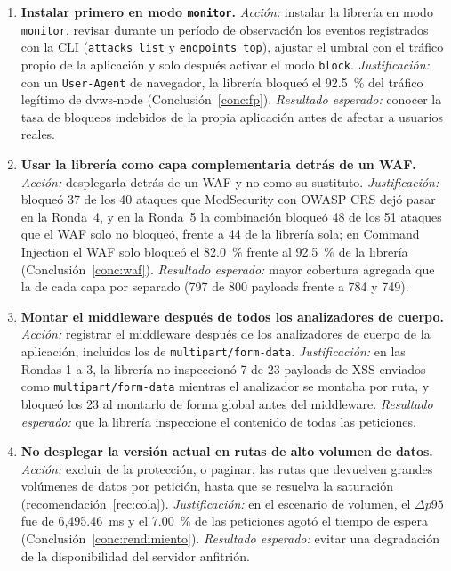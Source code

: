 \begin{enumerate}
    \item \textbf{Instalar primero en modo \texttt{monitor}.} \textit{Acción:} instalar la librería
    en modo \texttt{monitor}, revisar durante un período de observación los eventos registrados con
    la CLI (\texttt{attacks list} y \texttt{endpoints top}), ajustar el umbral con el tráfico propio
    de la aplicación y solo después activar el modo \texttt{block}. \textit{Justificación:} con un
    \texttt{User-Agent} de navegador, la librería bloqueó el 92.5~\% del tráfico legítimo de
    dvws-node (Conclusión~\ref{conc:fp}). \textit{Resultado esperado:} conocer la tasa de bloqueos
    indebidos de la propia aplicación antes de afectar a usuarios reales.

    \item \textbf{Usar la librería como capa complementaria detrás de un WAF.}
    \textit{Acción:} desplegarla detrás de un WAF y no como su sustituto. \textit{Justificación:}
    bloqueó 37 de los 40 ataques que ModSecurity con OWASP CRS dejó pasar en la Ronda~4, y en la
    Ronda~5 la combinación bloqueó 48 de los 51 ataques que el WAF solo no bloqueó, frente a 44 de la
    librería sola; en Command Injection el WAF solo bloqueó el 82.0~\% frente al 92.5~\% de la
    librería (Conclusión~\ref{conc:waf}). \textit{Resultado esperado:} mayor cobertura agregada que la
    de cada capa por separado (797 de 800 payloads frente a 784 y 749).

    \item \textbf{Montar el middleware después de todos los analizadores de cuerpo.}
    \textit{Acción:} registrar el middleware después de los analizadores de cuerpo de la aplicación,
    incluidos los de \texttt{multipart/form-data}. \textit{Justificación:} en las Rondas 1 a 3, la
    librería no inspeccionó 7 de 23 payloads de XSS enviados como \texttt{multipart/form-data}
    mientras el analizador se montaba por ruta, y bloqueó los 23 al montarlo de forma global antes
    del middleware. \textit{Resultado esperado:} que la librería inspeccione el contenido de todas
    las peticiones.

    \item \textbf{No desplegar la versión actual en rutas de alto volumen de datos.}
    \textit{Acción:} excluir de la protección, o paginar, las rutas que devuelven grandes volúmenes
    de datos por petición, hasta que se resuelva la saturación (recomendación~\ref{rec:cola}).
    \textit{Justificación:} en el escenario de volumen, el $\Delta p95$ fue de 6{,}495.46~ms y el
    7.00~\% de las peticiones agotó el tiempo de espera (Conclusión~\ref{conc:rendimiento}).
    \textit{Resultado esperado:} evitar una degradación de la disponibilidad del servidor anfitrión.
\end{enumerate}

